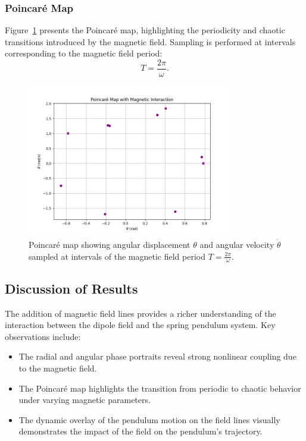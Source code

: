 \documentclass[12pt]{article}
\begin{document}
\subsubsection{Poincaré Map}
Figure~\ref{fig:poincare_map_fieldLines} presents the Poincaré map, highlighting the periodicity and chaotic transitions introduced by the magnetic field. Sampling is performed at intervals corresponding to the magnetic field period:
\[
T = \frac{2\pi}{\omega}.
\]

\begin{figure}[h!]
    \centering
    \includegraphics[width=0.8\textwidth]{poincare_map_fieldLines.png}
    \caption{Poincaré map showing angular displacement \( \theta \) and angular velocity \( \dot{\theta} \) sampled at intervals of the magnetic field period \( T = \frac{2\pi}{\omega} \).}
    \label{fig:poincare_map_fieldLines}
\end{figure}

\subsection{Discussion of Results}
The addition of magnetic field lines provides a richer understanding of the interaction between the dipole field and the spring pendulum system. Key observations include:
\begin{itemize}
    \item The radial and angular phase portraits reveal strong nonlinear coupling due to the magnetic field.
    \item The Poincaré map highlights the transition from periodic to chaotic behavior under varying magnetic parameters.
    \item The dynamic overlay of the pendulum motion on the field lines visually demonstrates the impact of the field on the pendulum's trajectory.
\end{itemize}
\end{document}
